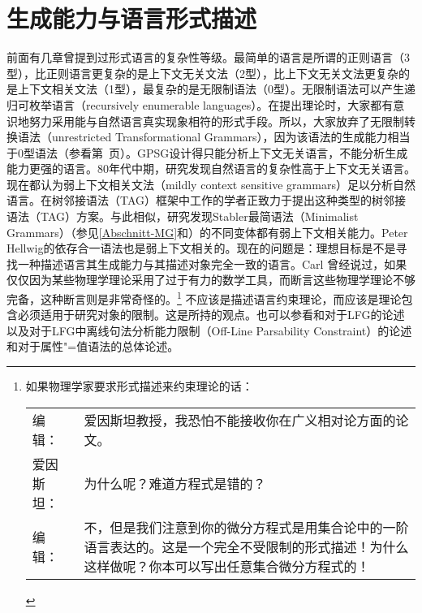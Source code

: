
\chapter{生成能力与语言形式描述}
\label{sec-generative-capacity}

前面有几章曾提到过形式语言的复杂性等级。最简单的语言是所谓的正则语言（3型），比正则语言更复杂的是上下文无关文法（2型），比上下文无关文法更复杂的是上下文相关文法（1型），最复杂的是无限制语法（0型）。无限制语法可以产生递归可枚举语言（recursively enumerable languages）。在提出理论时，大家都有意识地努力采用能与自然语言真实现象相符的形式手段。所以，大家放弃了无限制转换语法（unrestricted Transformational Grammars），因为该语法的生成能力相当于0型语法（参看第~\pageref{page-TG-Typ0}页）。GPSG设计得只能分析上下文无关语言，不能分析生成能力更强的语言。80年代中期，研究发现自然语言的复杂性高于上下文无关语言\citep{Shieber85a,Culy85a}。现在都认为弱上下文相关文法（mildly context sensitive grammars）足以分析自然语言。在树邻接语法\indextag （TAG）框架中工作的学者正致力于提出这种类型的树邻接语法\indextagc （TAG）方案。与此相似，研究发现Stabler最简语法（Minimalist Grammars）\indexmgc （参见\ref{Abschnitt-MG}和\citealp{Stabler2001a,Stabler2010b}）的不同变体都有弱上下文相关能力\citep{Michaelis2001a-u}。Peter Hellwig的依存合一语法也是弱上下文相关的\citep[]{Hellwig2003a}。现在的问题是：理想目标是不是寻找一种描述语言其生成能力与其描述对象完全一致的语言。Carl \citet{Pollard96a}曾经说过，如果仅仅因为某些物理学理论采用了过于有力的数学工具，而断言这些物理学理论不够完备，这种断言则是非常奇怪的。\footnote{%
如果物理学家要求形式描述来约束理论的话：\\
\begin{tabular}{@{}l@{~}p{10.8cm}}
编辑：     & 爱因斯坦教授，我恐怕不能接收你在广义相对论方面的论文。\\
爱因斯坦： & 为什么呢？难道方程式是错的？\\
编辑：     & 不，但是我们注意到你的微分方程式是用集合论中的一阶语言表达的。这是一个完全不受限制的形式描述！为什么这样做呢？你本可以写出任意集合微分方程式的！ \citep{Pollard96a}
\end{tabular}
}
不应该是描述语言约束理论，而应该是理论包含必须适用于研究对象的限制。这是\citet[, 280]{Chomsky81b}所持的观点。也可以参看和对于LFG的论述以及对于LFG中离线句法分析能力限制（Off-Line Parsability Constraint）的论述和对于属性"=值语法的总体论述。
